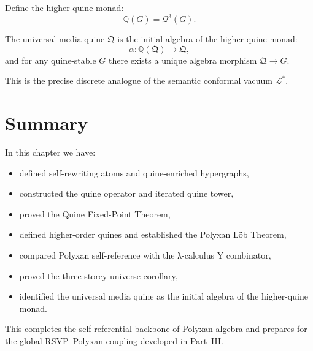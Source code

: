 Define the higher-quine monad:
\[
\mathbb{Q}(G)=\mathcal{Q}^3(G).
\]

\begin{theorem}
The universal media quine $\mathfrak{Q}$ is the initial algebra of the
higher-quine monad:
\[
\alpha : \mathbb{Q}(\mathfrak{Q}) \to \mathfrak{Q},
\]
and for any quine-stable $G$ there exists a unique algebra morphism 
$\mathfrak{Q}\to G$.
\end{theorem}

This is the precise discrete analogue of the semantic conformal vacuum 
$\mathcal{L}^{\ast}$.

\section{Summary}

In this chapter we have:

\begin{itemize}
\item defined self-rewriting atoms and quine-enriched hypergraphs,
\item constructed the quine operator and iterated quine tower,
\item proved the Quine Fixed-Point Theorem,
\item defined higher-order quines and established the Polyxan Löb Theorem,
\item compared Polyxan self-reference with the λ-calculus Y combinator,
\item proved the three-storey universe corollary,
\item identified the universal media quine as the initial algebra of the
higher-quine monad.
\end{itemize}

This completes the self-referential backbone of Polyxan algebra and prepares for
the global RSVP–Polyxan coupling developed in Part~III.
